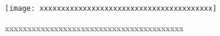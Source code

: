 

\begin{figure}[H]
\centering
\texttt{[image: xxxxxxxxxxxxxxxxxxxxxxxxxxxxxxxxxxxxxxxx]}
\caption{xxxxxxxxxxxxxxxxxxxxxxxxxxxxxxxxxxxxxxxx}
\end{figure}